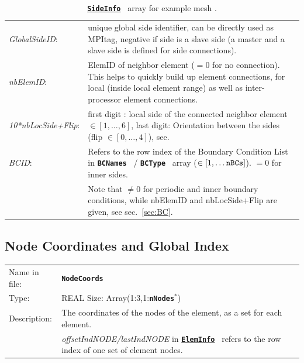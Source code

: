 \documentclass[a4paper,headsepline]{scrreprt}
\newcommand\rf[1]{\prettyref{#1}}
\newcommand\ttbf[1]{\textbf{\texttt{#1}}}
\newcommand\ElemInfo{\hyperlink{ElemInfo}{\ttbf{ElemInfo}}}
\newcommand\SideInfo{\hyperlink{SideInfo}{\ttbf{SideInfo}}}
\newcommand\BCNames{\ttbf{BCNames}}
\newcommand\BCType{\ttbf{BCType}}
\newcommand\nNodes{\ttbf{nNodes}}
\begin{document}
\begin{table}[h!]
\begin{tabularx}{1.0\textwidth}{|lX|}
%
\emph{GlobalSideID}:    & unique global side identifier, can be directly used as MPItag, negative if side is a slave side (a master and a slave side is defined for side connections). \\
%
\emph{nbElemID}:        & ElemID of neighbor element ($=0$ for no connection). This helps to quickly build up element connections, for local (inside local element range) as well as inter-processor element connections. \\
\emph{10*nbLocSide+Flip}:  &  first digit : local side of the connected neighbor element$\in[1,\dots,6]$, last digit: Orientation between the sides (flip $\in [0,\dots,4]$), see\rf{sec:flip}. \\
%
\emph{BCID}:            & Refers to the row index of the Boundary Condition List in \BCNames~ / \BCType~ array ($\in[1,\dots\text{\texttt{nBCs}}]$). $=0$ for inner sides. \\
                        & Note that $\neq 0$ for periodic and inner boundary conditions, while nbElemID and nbLocSide+Flip are given, see sec.~\ref{sec:BC}.     \\\hline
\end{tabularx}
\caption{\protect\SideInfo~ array for example mesh \rf{fig:exmesh}.}
\end{table}



\newpage

\hypertarget{NodeInfo}{\subsection{Node Coordinates and Global Index}}
\label{sec:NodeCoords}

\begin{tabularx}{1.0\textwidth}{lX}
Name in  file: & \textbf{\texttt{NodeCoords}}\\
Type:         & REAL \quad Size: Array(1:3,1:\nNodes$^*$) \\
Description:  & The coordinates of the nodes of the element, as a set for each element.  \\
              & \emph{offsetIndNODE/lastIndNODE} in \ElemInfo~ refers to the row index of one set of element nodes. \\
\end{tabularx}
\end{document}
